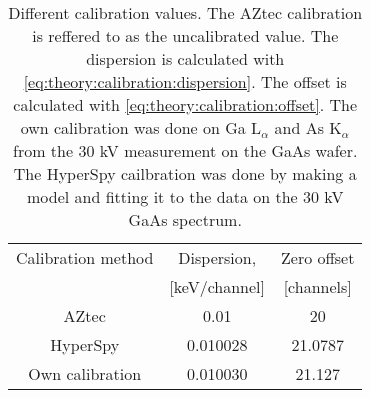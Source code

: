 \begin{table}[ht]
    \centering
    \caption{
        Different calibration values.
        The AZtec calibration is reffered to as the uncalibrated value.
        The dispersion is calculated with \cref{eq:theory:calibration:dispersion}.
        The offset is calculated with \cref{eq:theory:calibration:offset}.
        The own calibration was done on Ga L$_\alpha$ and As K$_\alpha$ from the 30 kV measurement on the GaAs wafer.
        The HyperSpy cailbration was done by making a model and fitting it to the data on the 30 kV GaAs spectrum.
    }
    \label{tab:results:calibrations}
    \begin{tabular}{ccc}
        Calibration method & Dispersion,   & Zero offset \\
                           & [keV/channel] & [channels]  \\
        \hline
        AZtec              & 0.01          & 20          \\
        HyperSpy           & 0.010028      & 21.0787     \\
        Own calibration    & 0.010030      & 21.127
    \end{tabular}
\end{table}
